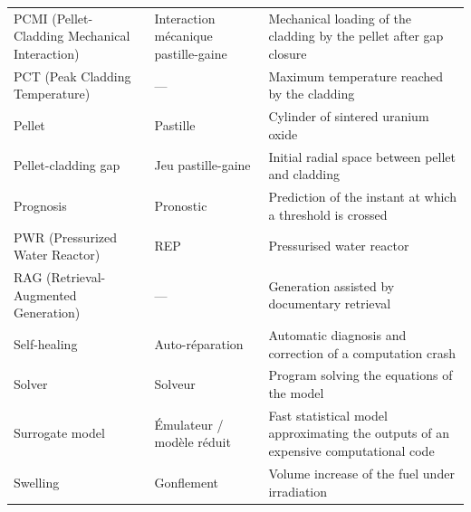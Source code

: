 \begin{xltabular}{\textwidth}{@{}>{\raggedright\arraybackslash}p{4.2cm}
                     >{\raggedright\arraybackslash}p{3.1cm}
                     >{\raggedright\arraybackslash}X@{}}
PCMI (Pellet-Cladding Mechanical Interaction) & Interaction mécanique
  pastille-gaine & Mechanical loading of the cladding by the pellet after gap
  closure\\
PCT (Peak Cladding Temperature) & --- & Maximum temperature reached by the
  cladding\\
Pellet & Pastille & Cylinder of sintered uranium oxide\\
Pellet-cladding gap & Jeu pastille-gaine & Initial radial space between pellet
  and cladding\\
Prognosis & Pronostic & Prediction of the instant at which a threshold is
  crossed\\
PWR (Pressurized Water Reactor) & REP & Pressurised water reactor\\
RAG (Retrieval-Augmented Generation) & --- & Generation assisted by documentary
  retrieval\\
Self-healing & Auto-réparation & Automatic diagnosis and correction of a
  computation crash\\
Solver & Solveur & Program solving the equations of the model\\
Surrogate model & Émulateur / modèle réduit & Fast statistical model
  approximating the outputs of an expensive computational code\\
Swelling & Gonflement & Volume increase of the fuel under irradiation\\
\bottomrule
\end{xltabular}

\clearpage
